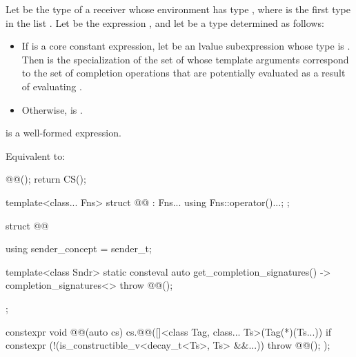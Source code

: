 \begin{itemdescr}
\pnum
Let  be the type of a receiver whose
environment has type , where
 is the first type in the list .
Let  be the expression
, and
let  be a type determined as follows:

\begin{itemize}
\item%
If  is a core constant expression,
let  be an lvalue subexpression
whose type is .
Then  is the specialization of 
the set of whose template arguments
correspond to the set of completion operations
that are potentially evaluated
as a result of evaluating .

\item%
Otherwise,  is .
\end{itemize}

\pnum
\constraints
{} is a well-formed expression.

\pnum
\effects
Equivalent to:
\begin{codeblock}
@@();
return CS();
\end{codeblock}
\end{itemdescr}

\pnum
{}
\begin{codeblock}
template<class... Fns>
struct @@ : Fns... {
  using Fns::operator()...;
};
\end{codeblock}

\pnum
{}
\begin{codeblock}
struct @@ {
  using sender_concept = sender_t;

  template<class Sndr>
    static consteval auto get_completion_signatures() -> completion_signatures<> {
      throw @@();
  }
};
\end{codeblock}

\pnum
{}
\begin{codeblock}
constexpr void @@(auto cs) {
  cs.@@([]<class Tag, class... Ts>(Tag(*)(Ts...)) {
    if constexpr (!(is_constructible_v<decay_t<Ts>, Ts> &&...))
      throw @@();
  });
}
\end{codeblock}

